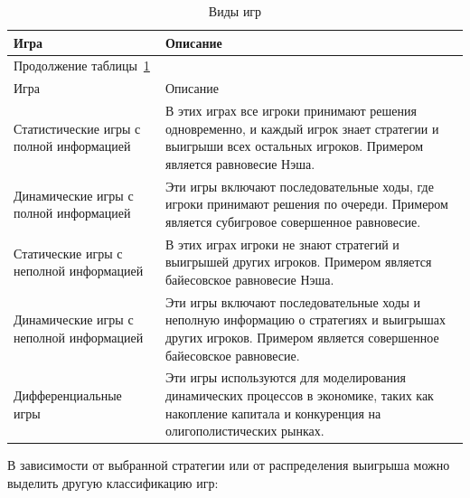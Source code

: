 \begin{longtable}[c]{|p{}|p{}|} %
    \caption{Виды игр}\label{Namelists}
    \\
    \hline
    Игра & Описание               \\ \hline
    \endfirsthead   
    \multicolumn{2}{l}{\hspace{-2mm}Продолжение таблицы~\ref{Namelists}}        \\ %
\hline
    Игра & Описание              \\ \hline \endhead        \hline %
    \endfoot        \hline
    \endlastfoot
	Статистические игры с полной информацией & В этих играх все игроки принимают решения одновременно, и каждый игрок знает стратегии и выигрыши всех остальных игроков. Примером является равновесие Нэша. \\
     \hline
	Динамические игры с полной информацией & Эти игры включают последовательные ходы, где игроки принимают решения по очереди. Примером является субигровое совершенное равновесие. \\
     \hline
	Статические игры с неполной информацией & В этих играх игроки не знают стратегий и выигрышей других игроков. Примером является байесовское равновесие Нэша. \\
     \hline
Динамические игры с неполной информацией & Эти игры включают последовательные ходы и неполную информацию о стратегиях и выигрышах других игроков. Примером является совершенное байесовское равновесие. \\
\hline

Дифференциальные игры & Эти игры используются для моделирования динамических процессов в экономике, таких как накопление капитала и конкуренция на олигополистических рынках. \\
\hline
\end{longtable}


В зависимости от выбранной стратегии или от распределения выигрыша можно выделить другую классификацию игр:

